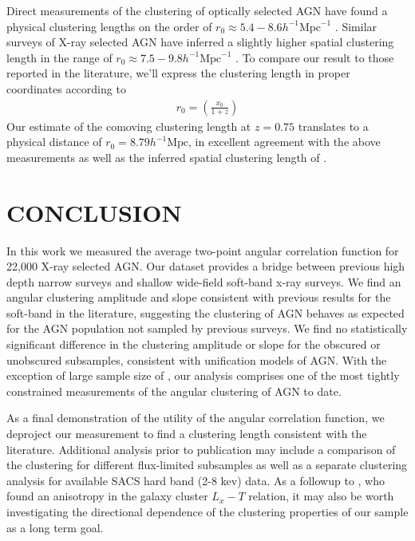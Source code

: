 \documentclass[preprint]{aastex63}
\begin{document}
Direct measurements of the clustering of optically selected AGN have found a physical clustering lengths on the order of $r_0 \approx 5.4 - 8.6 h^{-1} \text{Mpc}^{-1}$ \citep{akylas:2000,croom:2002,grazian:2004}. 
Similar surveys of X-ray selected AGN have inferred a slightly higher spatial clustering length in the range of $r_0 \approx 7.5 - 9.8 h^{-1} \text{Mpc}^{-1}$ \citep{basilakos:2008,miyaji,plionis:2018}. To compare our result to 
those reported in the literature, we'll express the clustering length in proper coordinates according to 
\begin{align}
    \label{eq:prop_coord}
    r_0 = \left(\frac{x_0}{1+z}\right)
\end{align}
Our estimate of the comoving clustering length at $z = 0.75$ translates to a physical distance of $r_0 = 8.79 h^{-1} \text{Mpc}$, in excellent agreement with the above measurements 
as well as the inferred spatial clustering length of \citet{ebrero}.
\section{CONCLUSION}

In this work we measured the average two-point angular correlation function
for 22,000 X-ray selected AGN. Our dataset provides a bridge 
between previous high depth narrow surveys and
shallow wide-field soft-band x-ray surveys. We find an angular clustering 
amplitude and slope consistent with previous results for the soft-band in the literature, 
suggesting the clustering of AGN behaves as expected for the AGN population not sampled by previous surveys.
We find no statistically significant difference in the clustering amplitude or 
slope for the obscured or unobscured subsamples, consistent with unification models of AGN. With the exception of large sample size of \citet{ebrero}, our analysis comprises one of the most tightly constrained measurements
of the angular clustering of AGN to date.

As a final demonstration of the utility of the angular correlation function, we deproject our measurement to find a clustering length consistent with the literature.
Additional analysis prior to publication may include a comparison of the clustering 
for different flux-limited subsamples as well as a separate clustering analysis for available SACS hard band (2-8 kev) data. As a followup to 
\citet{migkas}, who found an anisotropy in the galaxy cluster $L_x - T$ relation, it may also be worth investigating the directional dependence of 
the clustering properties of our sample as a long term goal.
\end{document}
